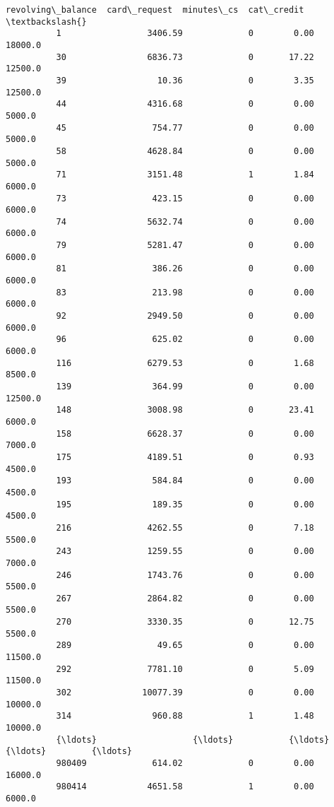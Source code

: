 \documentclass[11pt]{article}
\begin{document}
\begin{Verbatim}[commandchars=\\\{\}]
                  revolving\_balance  card\_request  minutes\_cs  cat\_credit  \textbackslash{}
          1                 3406.59             0        0.00     18000.0   
          30                6836.73             0       17.22     12500.0   
          39                  10.36             0        3.35     12500.0   
          44                4316.68             0        0.00      5000.0   
          45                 754.77             0        0.00      5000.0   
          58                4628.84             0        0.00      5000.0   
          71                3151.48             1        1.84      6000.0   
          73                 423.15             0        0.00      6000.0   
          74                5632.74             0        0.00      6000.0   
          79                5281.47             0        0.00      6000.0   
          81                 386.26             0        0.00      6000.0   
          83                 213.98             0        0.00      6000.0   
          92                2949.50             0        0.00      6000.0   
          96                 625.02             0        0.00      6000.0   
          116               6279.53             0        1.68      8500.0   
          139                364.99             0        0.00     12500.0   
          148               3008.98             0       23.41      6000.0   
          158               6628.37             0        0.00      7000.0   
          175               4189.51             0        0.93      4500.0   
          193                584.84             0        0.00      4500.0   
          195                189.35             0        0.00      4500.0   
          216               4262.55             0        7.18      5500.0   
          243               1259.55             0        0.00      7000.0   
          246               1743.76             0        0.00      5500.0   
          267               2864.82             0        0.00      5500.0   
          270               3330.35             0       12.75      5500.0   
          289                 49.65             0        0.00     11500.0   
          292               7781.10             0        5.09     11500.0   
          302              10077.39             0        0.00     10000.0   
          314                960.88             1        1.48     10000.0   
          {\ldots}                   {\ldots}           {\ldots}         {\ldots}         {\ldots}   
          980409             614.02             0        0.00     16000.0   
          980414            4651.58             1        0.00      6000.0   

\end{Verbatim}
\end{document}
